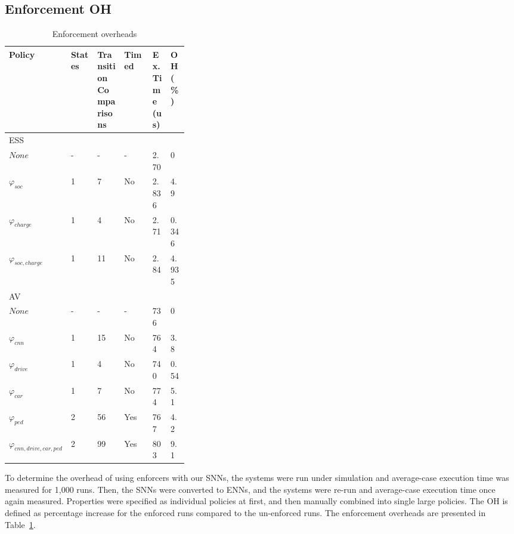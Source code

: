\subsection{Enforcement \acf{OH}}

\begin{table}[h]
	\vspace{-2mm}
	\centering
	\caption{Enforcement overheads}
	\label{table:policies}
	\begin{tabular}{|l|l|p{0.15\linewidth}|l|p{0.1\linewidth}|p{0.1\linewidth}|}
		\hline Policy & States & Transition Comparisons & Timed &  Ex. Time (us) &  OH (\%) \\ \hline
		\multicolumn{6}{|p{0.70\linewidth}|}{\ac{ESS}} \\ \hline 
		$None$ 										& - & - & - & 2.70 & 0 \\ 	
		$\varphi_{soc}$    							& 1 & 7 & No & 2.836 & 4.9 \\
		$\varphi_{charge}$    						& 1 & 4 & No & 2.71 & 0.346 \\
		$\varphi_{soc,charge}$  	& 1 & 11 & No & 2.84 & 4.935 \\ \hline       
		\multicolumn{6}{|p{0.70\linewidth}|}{\ac{AV}} \\ \hline
		$None$ 						& - & -  & -  & 736 & 0 \\
		$\varphi_{cnn}$ 			& 1 & 15 & No & 764 & 3.8 \\
		$\varphi_{drive}$ 			& 1 & 4 & No & 740 & 0.54 \\
		$\varphi_{car}$ 			& 1 & 7 & No & 774 & 5.1 \\
		$\varphi_{ped}$ 			& 2 & 56 & Yes & 767 & 4.2 \\
		$\varphi_{cnn,drive,car,ped}$ 	
		& 2 & 99 & Yes & 803 & 9.1 \\ \hline           
	\end{tabular}
\vspace{-2mm}
\end{table}

To determine the overhead of using enforcers with our \acp{SNN}, the systems were run under simulation and average-case execution time was measured for 1,000 runs. 
Then, the \acp{SNN} were converted to \acp{ENN}, and the systems were re-run and average-case execution time once again measured.
Properties were specified as individual policies at first, and then manually combined into single large policies.
The \acf{OH} is defined as percentage increase for the enforced runs compared to the un-enforced runs.
The enforcement overheads are presented in Table~\ref{table:policies}.

